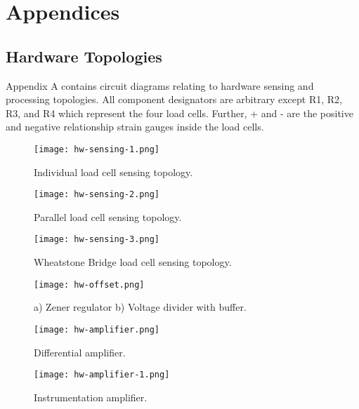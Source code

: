 
\part{Appendices}

\chapter{Hardware Topologies}

Appendix A contains circuit diagrams relating to hardware sensing and processing topologies. All component designators are arbitrary except R1, R2, R3, and R4 which represent the four load cells. Further, + and - are the positive and negative relationship strain gauges inside the load cells.

\begin{figure}[!ht]
	\centering
	\texttt{[image: hw-sensing-1.png]}
	\caption{Individual load cell sensing topology.}
	\label{fig:sense-1}
\end{figure}

\begin{figure}[!ht]
	\centering
	\texttt{[image: hw-sensing-2.png]}
	\caption{Parallel load cell sensing topology.}
	\label{fig:sense-2}
\end{figure}

\begin{figure}[!ht]
	\centering
	\texttt{[image: hw-sensing-3.png]}
	\caption{Wheatstone Bridge load cell sensing topology.}
	\label{fig:sense-3}
\end{figure}

\begin{figure}[!ht]
	\centering
	\texttt{[image: hw-offset.png]}
	\caption{a) Zener regulator b) Voltage divider with buffer.}
	\label{fig:offset}
\end{figure}

\begin{figure}[!ht]
	\centering
	\texttt{[image: hw-amplifier.png]}
	\caption{Differential amplifier.}
	\label{fig:amplifier}
\end{figure}

\begin{figure}[!ht]
	\centering
	\texttt{[image: hw-amplifier-1.png]}
	\caption{Instrumentation amplifier.}
	\label{fig:amplifier-2}
\end{figure}

